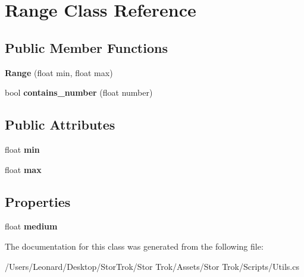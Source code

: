 \hypertarget{class_range}{}\section{Range Class Reference}
\label{class_range}
\subsection*{Public Member Functions}
\begin{DoxyCompactItemize}
\item 
\mbox{\label{class_range_a870d4c20c77fd12d570660f82935a79b}} 
{\bfseries Range} (float min, float max)
\item 
\mbox{\label{class_range_a68f1b9a17e2c21135b02e7c994124ae5}} 
bool {\bfseries contains\+\_\+number} (float number)
\end{DoxyCompactItemize}
\subsection*{Public Attributes}
\begin{DoxyCompactItemize}
\item 
\mbox{\label{class_range_aa1bddd6f00ebcda6aa9243973917b401}} 
float {\bfseries min}
\item 
\mbox{\label{class_range_a8d499f125609ce8b0d13fa0d50da840b}} 
float {\bfseries max}
\end{DoxyCompactItemize}
\subsection*{Properties}
\begin{DoxyCompactItemize}
\item 
\mbox{\label{class_range_a0e72f09a41f80baa93820834456bdb62}} 
float {\bfseries medium}
\end{DoxyCompactItemize}


The documentation for this class was generated from the following file\+:\begin{DoxyCompactItemize}
\item 
/\+Users/\+Leonard/\+Desktop/\+Stor\+Trok/\+Stor Trok/\+Assets/\+Stor Trok/\+Scripts/Utils.\+cs\end{DoxyCompactItemize}
